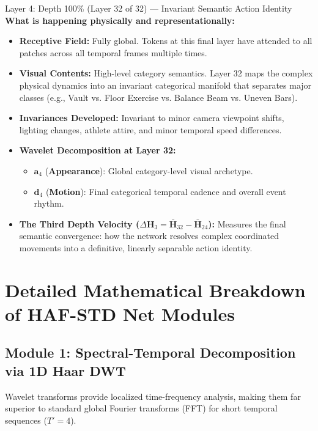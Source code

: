 \documentclass[a4paper, 11pt]{article}
\begin{document}
\begin{layerbox}{Layer 4: Depth 100\% (Layer 32 of 32) --- Invariant Semantic Action Identity}
\textbf{What is happening physically and representationally:}
\begin{itemize}
    \item \textbf{Receptive Field:} Fully global. Tokens at this final layer have attended to all patches across all temporal frames multiple times.
    \item \textbf{Visual Contents:} High-level category semantics. Layer 32 maps the complex physical dynamics into an invariant categorical manifold that separates major classes (e.g., Vault vs. Floor Exercise vs. Balance Beam vs. Uneven Bars).
    \item \textbf{Invariances Developed:} Invariant to minor camera viewpoint shifts, lighting changes, athlete attire, and minor temporal speed differences.
    \item \textbf{Wavelet Decomposition at Layer 32:}
    \begin{itemize}
        \item $\mathbf{a}_4$ (\textbf{Appearance}): Global category-level visual archetype.
        \item $\mathbf{d}_4$ (\textbf{Motion}): Final categorical temporal cadence and overall event rhythm.
    \end{itemize}
    \item \textbf{The Third Depth Velocity ($\Delta\mathbf{H}_3 = \bar{\mathbf{H}}_{32} - \bar{\mathbf{H}}_{24}$):}
    Measures the final semantic convergence: how the network resolves complex coordinated movements into a definitive, linearly separable action identity.
\end{itemize}
\end{layerbox}

\vspace{0.3cm}

\section{Detailed Mathematical Breakdown of HAF-STD Net Modules}

\subsection{Module 1: Spectral-Temporal Decomposition via 1D Haar DWT}
Wavelet transforms provide localized time-frequency analysis, making them far superior to standard global Fourier transforms (FFT) for short temporal sequences ($T'=4$).
\end{document}
